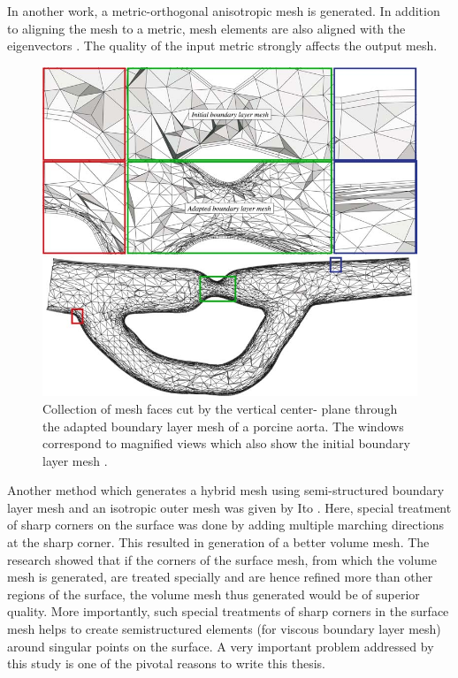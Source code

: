 In another work, a metric-orthogonal anisotropic mesh is generated. In addition to aligning the mesh to a metric, mesh elements are also aligned with the eigenvectors \cite{loseille20093d}. The quality of the input metric strongly affects the output mesh.

\begin{figure}
	\centering
	\includegraphics[width=0.8\linewidth]{img/intro/lit/sahni.png}
	\caption{ Collection of mesh faces cut by the vertical center- plane through the adapted boundary layer mesh of a porcine aorta. The windows correspond to magnified views which also show the initial boundary layer mesh \cite{sahni2008adaptive}.}
	\label{fig-sahni}
\end{figure}

Another method which generates a hybrid mesh using semi-structured boundary layer mesh and an isotropic outer mesh was given by Ito \etal \cite{ito2007multiple}. Here, special treatment of sharp corners on the surface was done by adding multiple marching directions at the sharp corner. This resulted in generation of a better volume mesh. The research showed that if the corners of the surface mesh, from which the volume mesh is generated, are treated specially and are hence refined more than other regions of the surface, the volume mesh thus generated would be of superior quality. More importantly, such special treatments of sharp corners in the surface mesh helps to create semistructured elements (for viscous boundary layer mesh) around singular points on the surface. A very important problem addressed by this study is one of the pivotal reasons to write this thesis.

